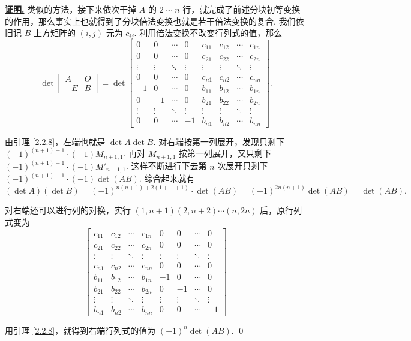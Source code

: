 \documentclass[10pt,openany]{article}
\theoremstyle{thmstyle} %
\theoremstyle{defstyle} %
\theoremstyle{prostyle} %
\theoremstyle{exastyle}
\theoremstyle{remstyle}
\renewenvironment{proof}[1][证明]{\par\underline{\textbf{#1.}} \;\fangsong}{\qed\par}
\begin{document}
\begin{proof}
	类似的方法，接下来依次干掉 \( A \) 的 \( 2\sim n \) 行，就完成了前述分块初等变换的作用，那么事实上也就得到了分块倍法变换也就是若干倍法变换的复合. 我们依旧记 \( B \) 上方矩阵的 \( (i,j) \) 元为 \( c_{ij} \). 利用倍法变换不改变行列式的值，那么
	\[ \det \begin{bmatrix}
		A & O \\
		-E & B
	\end{bmatrix}= \det \begin{bmatrix}
	 0 & 0 & \cdots & 0 & c_{11} & c_{12} & \cdots & c_{1n} \\
	 0 & 0 & \cdots & 0 & c_{21} & c_{22} & \cdots & c_{2n} \\
	\vdots & \vdots & \ddots & \vdots & \vdots & \vdots & \ddots & \vdots \\
	  0 & 0 & \cdots & 0 & c_{n1} & c_{n2} & \cdots & c_{nn} \\
	-1 & 0 & \cdots & 0  & b_{11} & b_{12} & \cdots & b_{1n} \\
	0 & -1 & \cdots & 0  & b_{21} & b_{22} & \cdots & b_{2n} \\
	\vdots & \vdots & \ddots & \vdots & \vdots & \vdots & \ddots & \vdots \\
	0 & 0 & \cdots & -1 & b_{n1} & b_{n2} & \cdots & b_{nn} 
	\end{bmatrix}. \]
	
	由引理 \ref{2.2.8}，左端也就是 \( \det A \det B \). 对右端按第一列展开，发现只剩下 \( (-1)^{(n+1)+1} \cdot (-1) M_{n+1,1} \). 再对 \( M_{n+1,1} \) 按第一列展开，又只剩下 \( (-1)^{(n+1)+1} \cdot (-1) M'_{n+1,1} \). 这样不断进行下去第 \( n \) 次展开只剩下 \( (-1)^{(n+1)+1} \cdot (-1) \det (AB) \). 综合起来就有
	\[ (\det A)(\det B)=(-1)^{n(n+1)+2(1+\cdots+1)} \cdot \det (AB)= (-1)^{2n(n+1)} \det (AB)= \det(AB). \]
	
	对右端还可以进行列的对换，实行 \( (1,n+1)(2,n+2)\cdots(n,2n) \) 后，原行列式变为
	\[ \begin{bmatrix}
		c_{11} & c_{12} & \cdots & c_{1n} & 0 & 0 & \cdots & 0 \\
		c_{21} & c_{22} & \cdots & c_{2n} & 0 & 0 & \cdots & 0 \\
		\vdots & \vdots & \ddots & \vdots & \vdots & \vdots & \ddots & \vdots \\
		c_{n1} & c_{n2} & \cdots & c_{nn} & 0 & 0 & \cdots & 0 \\
		b_{11} & b_{12} & \cdots & b_{1n} & -1 & 0 & \cdots & 0 \\
		b_{21} & b_{22} & \cdots & b_{2n} & 0 & -1 & \cdots & 0 \\
		\vdots & \vdots & \ddots & \vdots & \vdots & \vdots & \ddots & \vdots \\
		b_{n1} & b_{n2} & \cdots & b_{nn} & 0 & 0 & \cdots & -1
	\end{bmatrix} \]
	
	用引理 \ref{2.2.8}，就得到右端行列式的值为 \( (-1)^n \det (AB) \).
\end{proof}
\end{document}
